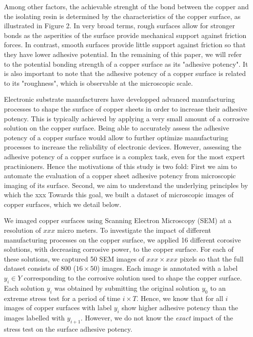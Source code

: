 \documentclass[10pt,twocolumn,letterpaper]{article}
\begin{document}
Among other factors, the achievable strenght of the bond between the copper and the isolating resin is determined by the characteristics of the copper surface, as illustrated in Figure 2. In very broad terms, rough surfaces allow for stronger bonds as the asperities of the surface provide mechanical support against friction forces. In contrast, smooth surfaces provide little support against friction so that they have lower adhesive potential. 
In the remaining of this paper, we will refer to the potential bonding strength of a copper surface as its "adhesive potency".
It is also important to note that the adhesive potency of a copper surface is related to its "roughness", which is observable at the microscopic scale.

Electronic substrate manufacturers have developped advanced manufacturing processes to shape the surface of copper sheets in order to increase their adhesive potency. This is typically achieved by applying a very small amount of a corrosive solution on the copper surface.
Being able to accurately assess the adhesive potency of a copper surface would allow to further optimize manufacturing processes to increase the reliability of electronic devices.
However, assessing the adhesive potency of a copper surface is a complex task, even for the most expert practinioners. 
Hence the motivations of this study is two fold: 
First we aim to automate the evaluation of a copper sheet adhesive potency from microscopic imaging of its surface. 
Second, we aim to understand the underlying principles by which the xxx 
Towards this goal, we built a dataset of microscopic images of copper surfaces, which we detail below.

We imaged copper surfaces using Scanning Electron Microscopy (SEM) at a resolution of $xxx$ micro meters.
To investigate the impact of different manufacturing processes on the copper surface, 
we applied 16 different corosive solutions, with decreasing corrosive power, to the copper surface.
For each of these solutions, we captured 50 SEM images of $xxx \times xxx$ pixels so that the full dataset
consists of $800$ ($16 \times 50$) images.
Each image is annotated with a label $y_i \in Y$ corresponding to the corrosive solution used to shape the copper surface.
Each solution $y_i$ was obtained by submitting the original solution $y_0$ to an extreme stress test for a period of time $i \times T$.
Hence, we know that for all $i$ images of copper surfaces with label $y_i$ show higher adhesive potency than the images labelled with $y_{i+1}$.
However, we do not know the \textit{exact} impact of the stress test on the surface adhesive potency.
\end{document}
